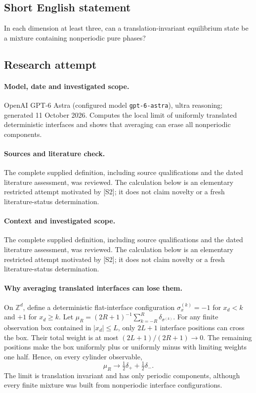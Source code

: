 \documentclass[11pt]{article}
\begin{document}
\subsection{Short English statement}
In each dimension at least three, can a translation-invariant equilibrium state be a mixture containing nonperiodic pure phases?
\subsection{Research attempt}
\paragraph{Model, date and investigated scope.}
OpenAI GPT-6 Astra (configured model \texttt{gpt-6-astra}), ultra reasoning; generated 11 October 2026. Computes the local limit of uniformly translated deterministic interfaces and shows that averaging can erase all nonperiodic components.

\paragraph{Sources and literature check.}
The complete supplied definition, including source qualifications and the dated literature assessment, was reviewed. The calculation below is an elementary restricted attempt motivated by [S2]; it does not claim novelty or a fresh literature-status determination.

\paragraph{Context and investigated scope.} The complete supplied definition, including source qualifications and the dated literature assessment, was reviewed. The calculation below is an elementary restricted attempt motivated by [S2]; it does not claim novelty or a fresh literature-status determination.

\paragraph{Why averaging translated interfaces can lose them.} On $\mathbb Z^d$, define a deterministic flat-interface configuration $\sigma^{(k)}_x=-1$ for $x_d<k$ and $+1$ for $x_d\geq k$. Let $\mu_R=(2R+1)^{-1}\sum_{k=-R}^R\delta_{\sigma^{(k)}}$. For any finite observation box contained in $|x_d|\leq L$, only $2L+1$ interface positions can cross the box. Their total weight is at most $(2L+1)/(2R+1)\to0$. The remaining positions make the box uniformly plus or uniformly minus with limiting weights one half. Hence, on every cylinder observable,
\[
 \mu_R\longrightarrow\tfrac12\delta_{+}+\tfrac12\delta_{-}.
\]
The limit is translation invariant and has only periodic components, although every finite mixture was built from nonperiodic interface configurations.
\end{document}
